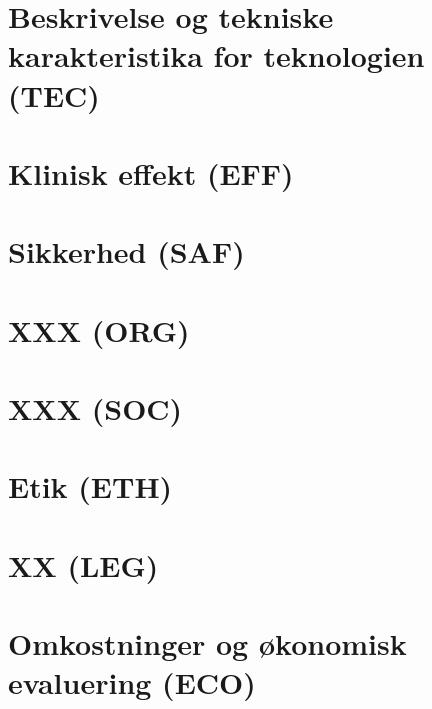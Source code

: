 \chapter{Beskrivelse og tekniske karakteristika for teknologien (TEC)}\vspace{-.75cm} \label{TEC_chap}


\chapter{Klinisk effekt (EFF)}\vspace{-.75cm} \label{EFF_chap}


\chapter{Sikkerhed (SAF)}\vspace{-.75cm} \label{SAF_chap}


\chapter{ XXX (ORG)}\vspace{-.75cm} \label{ORG_chap}


\chapter{ XXX (SOC)}\vspace{-.75cm} \label{SOC_chap}


\chapter{Etik (ETH)}\vspace{-.75cm} \label{ETH_chap}


\chapter{ XX (LEG)}\vspace{-.75cm} \label{LEG_chap}


\chapter{Omkostninger og økonomisk evaluering (ECO)}\vspace{-.75cm} \label{ECO_chap}




